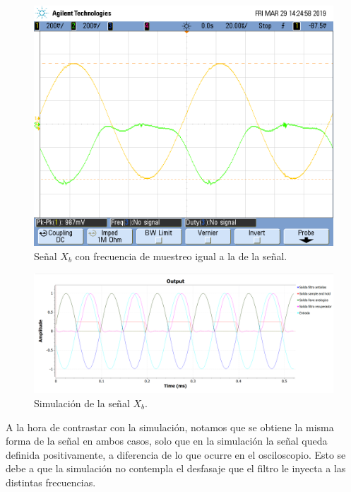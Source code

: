 \documentclass[../../ASSD_TP1_G7.tex]{subfiles}
\begin{document}
\begin{figure}[H]
\begin{centering}
\includegraphics[scale=0.5]{Imagenes/llave_senooo_pto_c}\caption{Señal $X_{b}$ con frecuencia de muestreo igual a la de la señal.}
\par\end{centering}
\end{figure}

\begin{figure}[H]

\begin{centering}
\includegraphics[scale=0.5]{Imagenes/simulacion_llave_seno_c}\caption{Simulación de la señal $X_{b}$.}
\par\end{centering}
\end{figure}

A la hora de contrastar con la simulación, notamos que se obtiene
la misma forma de la señal en ambos casos, solo que en la simulación
la señal queda definida positivamente, a diferencia de lo que ocurre
en el osciloscopio. Esto se debe a que la simulación no contempla
el desfasaje que el filtro le inyecta a las distintas frecuencias.
\end{document}
